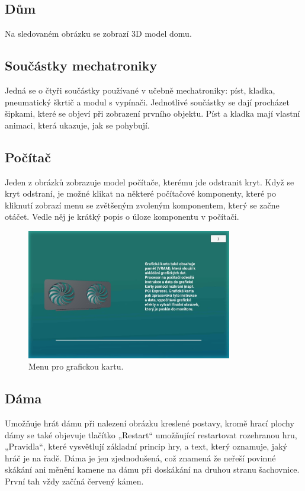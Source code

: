 \documentclass[12pt, a4paper,
twoside,        %
openright
]{report}
\begin{document}
	
	
\subsection{Dům}
 Na sledovaném obrázku se zobrazí 3D model domu.  
	
\subsection{Součástky mechatroniky}	
Jedná se o čtyři součástky používané v učebně mechatroniky: píst, kladka, pneumatický škrtič a modul s vypínači.
Jednotlivé součástky se dají procházet šipkami, které se objeví při zobrazení prvního objektu. Píst a kladka mají vlastní animaci, která ukazuje, jak se pohybují. 

\subsection{Počítač}	
Jeden z obrázků zobrazuje model počítače, kterému jde odstranit kryt. Když se kryt odstraní, je možné klikat na některé počítačové komponenty, které po kliknutí zobrazí menu se zvětšeným zvoleným komponentem, který se začne otáčet. Vedle něj je krátký popis o úloze komponentu v počítači.


\begin{figure}[h!]
	\centering 
	\includegraphics[width=0.8\textwidth]{image/gpumenu.jpg} 
	\caption{Menu pro grafickou kartu.} 
	\label{fig:component_,menu}
\end{figure}


\subsection{Dáma}	
Umožňuje hrát dámu při nalezení obrázku kreslené postavy, kromě hrací plochy dámy se také objevuje tlačítko „Restart“ umožňující restartovat rozehranou hru, „Pravidla“, které vysvětlují základní princip hry, a text, který oznamuje, jaký hráč je na řadě. Dáma je jen zjednodušená, což znamená že neřeší povinné skákání ani měnění kamene na dámu při doskákání na druhou stranu šachovnice. První tah vždy začíná červený kámen.  
\end{document}
